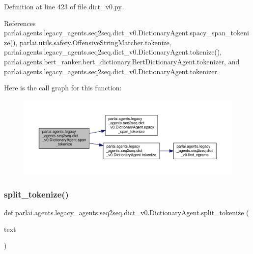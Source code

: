 Definition at line 423 of file dict\+\_\+v0.\+py.



References parlai.\+agents.\+legacy\+\_\+agents.\+seq2seq.\+dict\+\_\+v0.\+Dictionary\+Agent.\+spacy\+\_\+span\+\_\+tokenize(), parlai.\+utils.\+safety.\+Offensive\+String\+Matcher.\+tokenize, parlai.\+agents.\+legacy\+\_\+agents.\+seq2seq.\+dict\+\_\+v0.\+Dictionary\+Agent.\+tokenize(), parlai.\+agents.\+bert\+\_\+ranker.\+bert\+\_\+dictionary.\+Bert\+Dictionary\+Agent.\+tokenizer, and parlai.\+agents.\+legacy\+\_\+agents.\+seq2seq.\+dict\+\_\+v0.\+Dictionary\+Agent.\+tokenizer.

Here is the call graph for this function\+:
\nopagebreak
\begin{figure}[H]
\begin{center}
\leavevmode
\includegraphics[width=350pt]{classparlai_1_1agents_1_1legacy__agents_1_1seq2seq_1_1dict__v0_1_1DictionaryAgent_acb9c4128aa95e0a6dcd787c33395c877_cgraph}
\end{center}
\end{figure}
\mbox{\label{classparlai_1_1agents_1_1legacy__agents_1_1seq2seq_1_1dict__v0_1_1DictionaryAgent_a8c2c9af5d9d826650a2dcf0fe6adf2ec}} 
\subsubsection{\texorpdfstring{split\+\_\+tokenize()}{split\_tokenize()}}
{\footnotesize\ttfamily def parlai.\+agents.\+legacy\+\_\+agents.\+seq2seq.\+dict\+\_\+v0.\+Dictionary\+Agent.\+split\+\_\+tokenize (\begin{DoxyParamCaption}\item[{}]{text }\end{DoxyParamCaption})\hspace{0.3cm}{\ttfamily [static]}}

